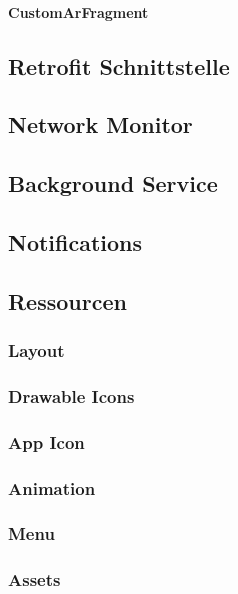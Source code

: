 \documentclass{scrartcl}
\begin{document}
\paragraph{CustomArFragment}

\subsection{Retrofit Schnittstelle}

\subsection{Network Monitor}

\subsection{Background Service}

\subsection{Notifications}

\subsection{Ressourcen}

\subsubsection{Layout}

\subsubsection{Drawable Icons}

\subsubsection{App Icon}

\subsubsection{Animation}

\subsubsection{Menu}

\subsubsection{Assets}
\end{document}
